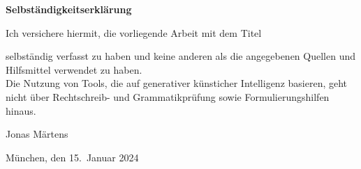 \thispagestyle{empty}
\vspace*{1cm}
{\huge \textbf{Selbständigkeitserklärung}}\\
\vspace*{1.5cm}

Ich versichere hiermit, die vorliegende Arbeit mit dem Titel

\begin{center}
    \textbf{\theTitle}
\end{center}

selbständig verfasst zu haben und keine anderen als die angegebenen Quellen und Hilfsmittel verwendet zu haben.
\\
Die Nutzung von Tools, die auf generativer künsticher Intelligenz basieren, geht nicht über Rechtschreib- und Grammatikprüfung sowie Formulierungshilfen hinaus.

\vspace*{3cm}

Jonas Märtens

\vspace*{1cm}
München, den 15.~Januar 2024
